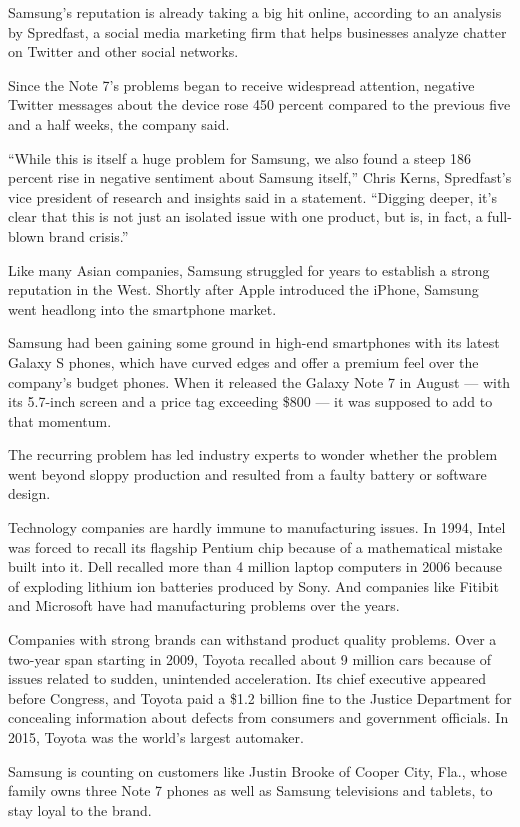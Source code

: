 Samsung's reputation is already taking a big hit online, according to an
analysis by Spredfast, a social media marketing firm that helps
businesses analyze chatter on Twitter and other social networks.

Since the Note 7's problems began to receive widespread attention,
negative Twitter messages about the device rose 450 percent compared to
the previous five and a half weeks, the company said.

``While this is itself a huge problem for Samsung, we also found a steep
186 percent rise in negative sentiment about Samsung itself,'' Chris
Kerns, Spredfast's vice president of research and insights said in a
statement. ``Digging deeper, it's clear that this is not just an
isolated issue with one product, but is, in fact, a full-blown brand
crisis.''

Like many Asian companies, Samsung struggled for years to establish a
strong reputation in the West. Shortly after Apple introduced the
iPhone, Samsung went headlong into the smartphone market.

Samsung had been gaining some ground in high-end smartphones with its
latest Galaxy S phones, which have curved edges and offer a premium feel
over the company's budget phones. When it released the Galaxy Note 7 in
August --- with its 5.7-inch screen and a price tag exceeding \$800 ---
it was supposed to add to that momentum.

The recurring problem has led industry experts to wonder whether the
problem went beyond sloppy production and resulted from a faulty battery
or software design.

Technology companies are hardly immune to manufacturing issues. In 1994,
Intel was forced to recall its flagship Pentium chip because of a
mathematical mistake built into it. Dell recalled more than 4 million
laptop computers in 2006 because of exploding lithium ion batteries
produced by Sony. And companies like Fitibit and Microsoft have had
manufacturing problems over the years.

Companies with strong brands can withstand product quality problems.
Over a two-year span starting in 2009, Toyota recalled about 9 million
cars because of issues related to sudden, unintended acceleration. Its
chief executive appeared before Congress, and Toyota paid a \$1.2
billion fine to the Justice Department for concealing information about
defects from consumers and government officials. In 2015, Toyota was the
world's largest automaker.

Samsung is counting on customers like Justin Brooke of Cooper City,
Fla., whose family owns three Note 7 phones as well as Samsung
televisions and tablets, to stay loyal to the brand.

